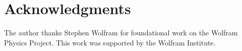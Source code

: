 
\section*{Acknowledgments}

The author thanks Stephen Wolfram for foundational work on the Wolfram Physics Project. This work was supported by the Wolfram Institute.


\FloatBarrier
